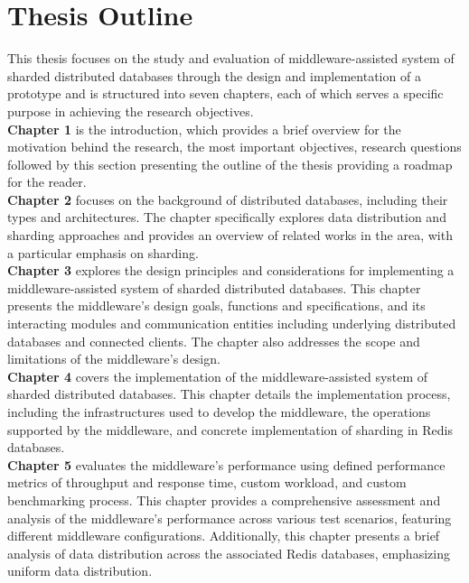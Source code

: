 \section{Thesis Outline}
This thesis focuses on the study and evaluation of middleware-assisted system of sharded distributed databases through the design and implementation of a prototype and is structured into seven chapters, each of which serves a specific purpose in achieving the research objectives. \\

\noindent \textbf{Chapter 1} is the introduction, which provides a brief overview for the motivation behind the research, the most important objectives, research questions followed by this section presenting the outline of the thesis providing a roadmap for the reader. \\

\noindent \textbf{Chapter 2} focuses on the background of distributed databases, including their types and architectures. The chapter specifically explores data distribution and sharding approaches and provides an overview of related works in the area, with a particular emphasis on sharding.\\

\noindent \textbf{Chapter 3} explores the design principles and considerations for implementing a middleware-assisted system of sharded distributed databases. This chapter presents the middleware’s design goals, functions and specifications, and its interacting modules and communication entities including underlying distributed databases and connected clients. The chapter also addresses the scope and limitations of the middleware’s design. \\

\noindent \textbf{Chapter 4} covers the implementation of the middleware-assisted system of sharded distributed databases. This chapter details the implementation process, including the infrastructures used to develop the middleware, the operations supported by the middleware, and concrete implementation of sharding in Redis databases. \\

\noindent \textbf{Chapter 5} evaluates the middleware’s performance using defined performance metrics of throughput and response time, custom workload, and custom benchmarking process. This chapter provides a comprehensive assessment and analysis of the middleware’s performance across various test scenarios, featuring different middleware configurations. Additionally, this chapter presents a brief analysis of data distribution across the associated Redis databases, emphasizing uniform data distribution. \\

